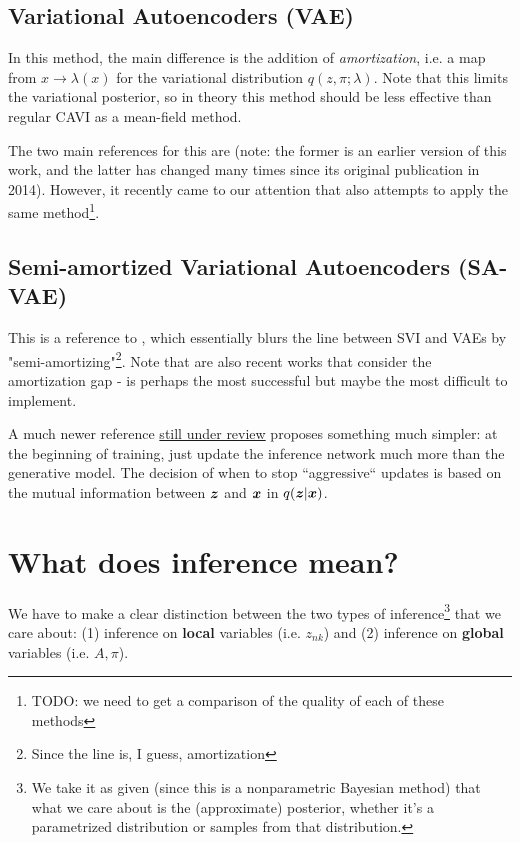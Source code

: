 \documentclass[a4paper, 11pt]{article}
\begin{document}
\subsection{Variational Autoencoders (VAE)}
In this method, the main difference is the addition of \emph{amortization}, i.e. a map from $x \to \lambda(x)$ for the variational distribution $q(z, \pi; \lambda)$. Note that this limits the variational posterior, so in theory this method should be less effective than regular CAVI as a mean-field method.

\medskip

The two main references for this are \citet{singhstructured, chatzis2018indian} (note: the former is an earlier version of this work, and the latter has changed many times since its original publication in 2014). However, it recently came to our attention that \citet{fanscalable} also attempts to apply the same method\footnote{TODO: we need to get a comparison of the quality of each of these methods}.

\subsection{Semi-amortized Variational Autoencoders (SA-VAE)}
This is a reference to \citet{kim2018semi}, which essentially blurs the line between SVI and VAEs by "semi-amortizing"\footnote{Since the line is, I guess, amortization}. Note that \citet{cremer2018inference,krishnan2018challenges,hjelm2016iterative} are also recent works that consider the amortization gap - \citet{kim2018semi} is perhaps the most successful but maybe the most difficult to implement.

\medskip

A much newer reference \href{https://openreview.net/forum?id=rylDfnCqF7}{still under review} proposes something much simpler: at the beginning of training, just update the inference network much more than the generative model. The decision of when to stop ``aggressive`` updates is based on the mutual information between $\bm{z}$ and $\bm{x}$ in $q(\bm{z} | \bm{x})$.

\section{What does inference mean?}
We have to make a clear distinction between the two types of inference\footnote{We take it as given (since this is a nonparametric Bayesian method) that what we care about is the (approximate) posterior, whether it's a parametrized distribution or samples from that distribution.} that we care about: (1) inference on \textbf{local} variables (i.e. $z_{nk}$) and (2) inference on \textbf{global} variables (i.e. $A, \pi$).
\end{document}
